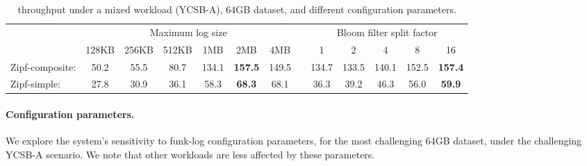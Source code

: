 \begin{table}
\centering
{\small{
\begin{tabular}{l|cccccc|c|ccccc|}
\cline{2-7} \cline{9-13} 
  & \multicolumn{6}{c|}{Maximum log size} & & \multicolumn{5}{c|}{Bloom filter split factor}\\
& 128KB & 256KB & 512KB & 1MB & 2MB & 4MB & &1 & 2 & 4 & 8 & 16 \\
\cline{2-7} \cline{9-13} 
Zipf-composite: & 50.2	& 55.5 & 80.7	& 134.1 & {\bf {157.5}} & 149.5 & & 134.7 & 133.5 & 140.1 & 152.5 & {\bf {157.4}}   \\
Zipf-simple:    & 27.8	& 30.9 & 36.1	& 58.3  & {\bf {68.3}}   & 68.1   & &  36.3 & 39.2   & 46.3  & 56.0  & {\bf {59.9}}\\
\cline{2-7} \cline{9-13} 
\end{tabular}
}}
\caption{{\sys\/ throughput under a mixed workload (YCSB-A), 64GB dataset, and different configuration parameters.}}
\label{fig:wal}
\end{table}

\paragraph{Configuration parameters.} 
We explore the system's  sensitivity to funk-log configuration parameters, for the most challenging 64GB dataset,
under the challenging YCSB-A scenario. We note  that other workloads are less affected by these parameters.


